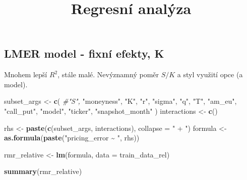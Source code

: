 \documentclass[
]{article}
\title{Regresní analýza}
\author{}
\date{\vspace{-2.5em}}
\newenvironment{Shaded}{\begin{snugshade}}{\end{snugshade}}
\newcommand{\AttributeTok}[1]{\textcolor[rgb]{0.13,0.29,0.53}{#1}}
\newcommand{\CommentTok}[1]{\textcolor[rgb]{0.56,0.35,0.01}{\textit{#1}}}
\newcommand{\FunctionTok}[1]{\textcolor[rgb]{0.13,0.29,0.53}{\textbf{#1}}}
\newcommand{\NormalTok}[1]{#1}
\newcommand{\OtherTok}[1]{\textcolor[rgb]{0.56,0.35,0.01}{#1}}
\newcommand{\StringTok}[1]{\textcolor[rgb]{0.31,0.60,0.02}{#1}}
\begin{document}
\maketitle

\subsection{LMER model - fixní efekty,
K}\label{lmer-model---fixnuxed-efekty-k}

Mnohem lepší \(R^2\), stále malé. Nevýznamný poměr \(S/K\) a styl
využití opce (a model).

\begin{Shaded}
\begin{Highlighting}[]
\NormalTok{subset\_args }\OtherTok{\textless{}{-}} \FunctionTok{c}\NormalTok{(}
  \CommentTok{\#"S",}
  \StringTok{"moneyness"}\NormalTok{,}
  \StringTok{"K"}\NormalTok{,}
  \StringTok{"r"}\NormalTok{,}
  \StringTok{"sigma"}\NormalTok{,}
  \StringTok{"q"}\NormalTok{,}
  \StringTok{"T"}\NormalTok{,}
  \StringTok{"am\_eu"}\NormalTok{,}
  \StringTok{"call\_put"}\NormalTok{,}
  \StringTok{"model"}\NormalTok{,}
  \StringTok{"ticker"}\NormalTok{,}
  \StringTok{"snapshot\_month"}
\NormalTok{)}
\NormalTok{interactions }\OtherTok{\textless{}{-}} \FunctionTok{c}\NormalTok{()}

\NormalTok{rhs }\OtherTok{\textless{}{-}} \FunctionTok{paste}\NormalTok{(}\FunctionTok{c}\NormalTok{(subset\_args, interactions), }\AttributeTok{collapse =} \StringTok{" + "}\NormalTok{)}
\NormalTok{formula }\OtherTok{\textless{}{-}} \FunctionTok{as.formula}\NormalTok{(}\FunctionTok{paste}\NormalTok{(}\StringTok{"pricing\_error \textasciitilde{} "}\NormalTok{, rhs))}

\NormalTok{rmr\_relative }\OtherTok{\textless{}{-}} \FunctionTok{lm}\NormalTok{(formula, }\AttributeTok{data =}\NormalTok{ train\_data\_rel)}
\end{Highlighting}
\end{Shaded}

\begin{Shaded}
\begin{Highlighting}[]
\FunctionTok{summary}\NormalTok{(rmr\_relative)}
\end{Highlighting}
\end{Shaded}
\end{document}
